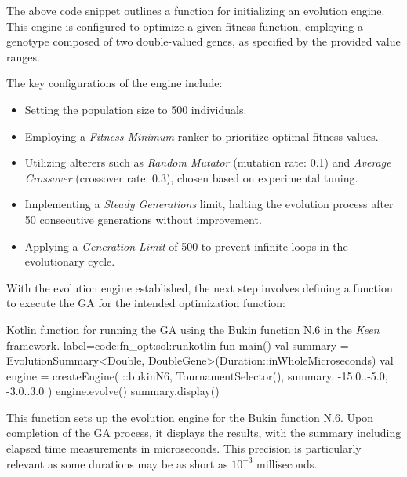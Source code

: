         The above code snippet outlines a function for initializing an evolution 
        engine. This engine is configured to optimize a given fitness function, 
        employing a genotype composed of two double-valued genes, as specified by 
        the provided value ranges.

        The key configurations of the engine include:

        \begin{itemize}
        \item Setting the population size to 500 individuals.
        \item Employing a \textit{Fitness Minimum} ranker to prioritize optimal 
            fitness values.
        \item Utilizing alterers such as \textit{Random Mutator} (mutation rate: 
            0.1) and \textit{Average Crossover} (crossover rate: 0.3), chosen based 
            on experimental tuning.
        \item Implementing a \textit{Steady Generations} limit, halting the 
            evolution process after 50 consecutive generations without improvement.
        \item Applying a \textit{Generation Limit} of 500 to prevent infinite 
            loops in the evolutionary cycle.
        \end{itemize}

        With the evolution engine established, the next step involves defining a function to execute the GA for the 
        intended optimization function:

        \begin{code}{
            Kotlin function for running the GA using the Bukin function N.6 in the \textit{Keen} framework.
        }{label=code:fn_opt:sol:run}{kotlin}
            fun main() {
                val summary = EvolutionSummary<Double, DoubleGene>(Duration::inWholeMicroseconds)
                val engine = createEngine(
                    ::bukinN6, 
                    TournamentSelector(), 
                    summary, 
                    -15.0..-5.0, 
                    -3.0..3.0
                )
                engine.evolve()
                summary.display()
            }
        \end{code}

        This function sets up the evolution engine for the Bukin function N.6. Upon completion of the GA process, it 
        displays the results, with the summary including elapsed time measurements in microseconds. This precision is 
        particularly relevant as some durations may be as short as \(10^{-3}\) milliseconds.

